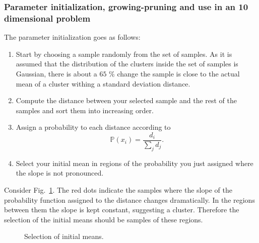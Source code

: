 \documentclass[letterpaper, 10 pt, conference]{ieeeconf}  %
\begin{document}
\subsubsection{Parameter initialization, growing-pruning and use in an 10
dimensional problem}
\label{sec:Experiment_growing_pruning_10}

The parameter initialization goes as follows:

\begin{enumerate}
\item Start by choosing a sample randomly from the set of samples. As it is assumed that the distribution of the clusters inside the set of samples is Gaussian, there is
about a $65$ \% change the sample is close to the actual mean of a cluster withing a standard deviation distance.
\item Compute the distance between your selected sample and the rest of the samples and sort them into increasing order.
\item Assign a probability to each distance according to 
\begin{equation*}
   \mathbb{P}(x_{i}) = \frac{d_{i}}{\sum_{j}d_{j}}.
\end{equation*}
\item Select your initial mean in regions of the probability you just assigned where the slope is not pronounced. 
\end{enumerate}

Consider Fig.~\ref{fig:ProbabilityAssigment}. The red dots indicate the samples where the slope of the probability function assigned to the distance changes dramatically. In the regions between them the slope is kept constant, suggesting a cluster. Therefore the selection of the initial means should be samples of these regions.

\begin{figure}[thpb]
      \centering
      \caption{Selection of initial means. }
      \label{fig:ProbabilityAssigment}
\end{figure}
\end{document}
